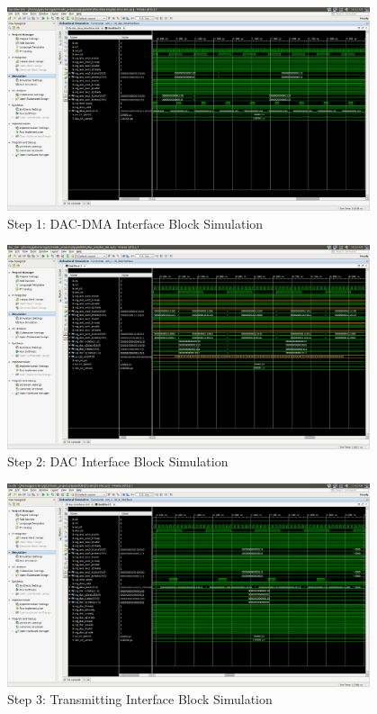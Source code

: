 \begin{figure}[htbp]
    \centering
    \includegraphics[width=0.95\textwidth]{./figures/dac_dmaInterface}
    \caption{ Step 1: DAC-DMA Interface Block Simulation
    \label{fig:simdacdma}}
\end{figure}

\begin{figure}[htbp]
    \centering
    \includegraphics[width=0.95\textwidth]{./figures/dacInterface}
    \caption{ Step 2: DAC Interface Block Simulation
    \label{fig:simdac}}
\end{figure}

\begin{figure}[htbp]
    \centering
    \includegraphics[width=0.95\textwidth]{./figures/txInterface}
    \caption{ Step 3: Transmitting Interface Block Simulation
    \label{fig:simtxif}}
\end{figure}

